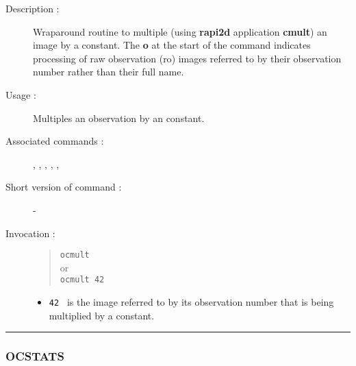 \begin{description}

\item[Description :] Wraparound routine to multiple (using {\bf rapi2d}
application {\bf cmult}) an image by a constant. The {\bf o} at the
start of the command indicates processing of raw observation ({\sc ro})
images referred to by their observation number rather than their full
name.

\item[Usage :] Multiples an observation by an constant.

\item[Associated commands :] {\tt {}}, 
{\tt {}}, {\tt {}}, 
{\tt {}}, {\tt {}}, {\tt {}}

\item[Short version of command :] -
\item[Invocation :]

\begin{quote}{\tt  ocmult }\\
or \\
{\tt ocmult 42 }
\end{quote}

\begin{itemize}

\item {\tt 42 } is the image referred to by its observation number that
is being multiplied by a constant.
\end{itemize}

\end{description}

\hrule 
\subsubsection*{\label{OCSTATS}OCSTATS}

